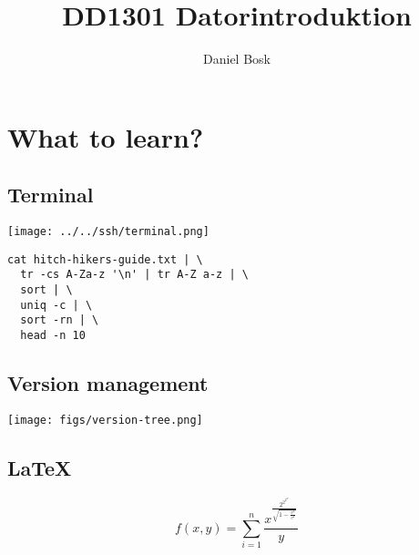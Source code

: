 \title{%
  DD1301 Datorintroduktion
}
\author{Daniel Bosk}


\mode*


\section{What to learn?}

\subsection{Terminal}

\begin{frame}
  \texttt{[image: ../../ssh/terminal.png]}
\end{frame}

\begin{frame}[fragile]
  \begin{lstlisting}[numbers=none]
cat hitch-hikers-guide.txt | \
  tr -cs A-Za-z '\n' | tr A-Z a-z | \
  sort | \
  uniq -c | \
  sort -rn | \
  head -n 10
  \end{lstlisting}
\end{frame}


\subsection{Version management}

\begin{frame}
  \texttt{[image: figs/version-tree.png]}
\end{frame}


\subsection{\LaTeX}

\begin{frame}
\[
  f(x, y) = \sum_{i=1}^n 
  \frac{x^{\frac{2^{2^{2^{2^n}}}}{\sqrt{1-\frac{v^2}{c^2}}}}}{y}
\]

\end{frame}

